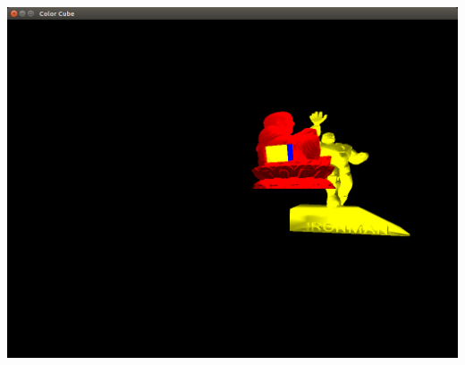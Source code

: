 \documentclass[12pt,a4paper]{article}
\begin{document}
\includegraphics[width=\textwidth]{1.png}	
\end{document}

